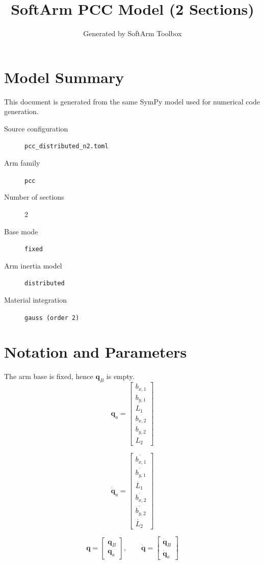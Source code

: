 \documentclass[11pt]{article}
\title{SoftArm PCC Model (2 Sections)}
\author{Generated by SoftArm Toolbox}
\date{}
\begin{document}
\maketitle

\section{Model Summary}
This document is generated from the same SymPy model used for numerical code generation.
\begin{description}
\item[Source configuration] \texttt{pcc\_distributed\_n2.toml}
\item[Arm family] \texttt{pcc}
\item[Number of sections] 2
\item[Base mode] \texttt{fixed}
\item[Arm inertia model] \texttt{distributed}
\item[Material integration] \texttt{gauss (order 2)}
\end{description}

\section{Notation and Parameters}
The arm base is fixed, hence $\boldsymbol q_B$ is empty.
\begin{equation}
\boldsymbol q_a=\begin{bmatrix}b_{x,1}\\b_{y,1}\\L_{1}\\b_{x,2}\\b_{y,2}\\L_{2}\end{bmatrix}
\end{equation}

\begin{equation}
\dot{\boldsymbol q}_a=\begin{bmatrix}\dot{b_{x,1}}\\\dot{b_{y,1}}\\\dot{L_{1}}\\\dot{b_{x,2}}\\\dot{b_{y,2}}\\\dot{L_{2}}\end{bmatrix}
\end{equation}

\begin{equation}
\boldsymbol q=\begin{bmatrix}\boldsymbol q_B\\\boldsymbol q_a\end{bmatrix},\qquad \dot{\boldsymbol q}=\begin{bmatrix}\dot{\boldsymbol q}_B\\\dot{\boldsymbol q}_a\end{bmatrix}
\end{equation}
\end{document}
